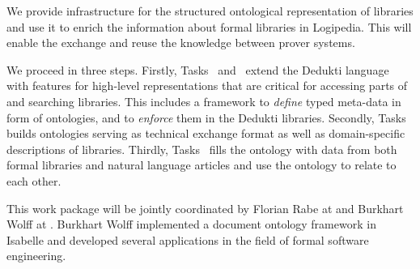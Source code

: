 \begin{workpackage}[id=structuring,wphases=0-48,type=RTD,
  short=Structured Theories and Metadata,%
  title=Structured Theories and Metadata,
  lead=Fau,
  BolRM=4,
  FauRM=20,
  SacRM=40
]
  


\begin{wpobjectives}
We provide infrastructure for the structured ontological representation of libraries and use it to enrich the information about formal libraries in Logipedia.
This will enable the exchange and reuse the knowledge between prover systems.
\end{wpobjectives}


\begin{wpdescription}
We proceed in three steps.
Firstly, Tasks~ and~ extend the Dedukti language with features for high-level representations that are critical for accessing parts of and searching libraries.
This includes a framework to \emph{define} typed meta-data in form of ontologies, and to \emph{enforce} them in 
the Dedukti libraries.
Secondly, Tasks~ builds ontologies serving as technical exchange format as well as domain-specific descriptions of libraries.
Thirdly, Tasks~ fills the ontology with data from both formal libraries and natural language articles and use the ontology to relate to each other.

This work package will be jointly coordinated by Florian Rabe at  and Burkhart Wolff at .
Burkhart Wolff implemented a document ontology framework in Isabelle and developed several applications
in the field of formal software engineering.
\cite{brucker.ea:ontologies-certification:2019,brucker.ea:isabelle-ontologies:2018,brucker.ea:ontologies-certification:2019} 
\end{wpdescription}


\end{workpackage}
